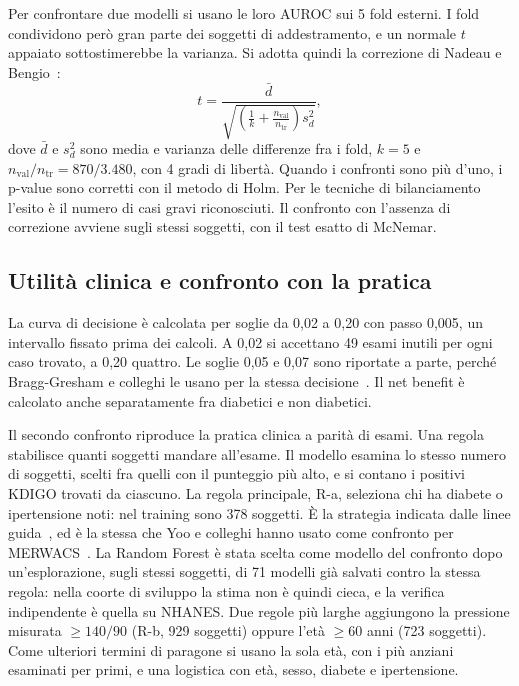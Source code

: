 \documentclass[a4paper, 12pt, oneside]{book}
\begin{document}
Per confrontare due modelli si usano le loro AUROC sui 5 fold esterni. I fold condividono però gran parte dei soggetti di addestramento, e un normale $t$ appaiato sottostimerebbe la varianza. Si adotta quindi la correzione di Nadeau e Bengio~\cite{nadeau_inference_2003}:
\begin{equation}
	t = \frac{\bar d}{\sqrt{\left(\frac{1}{k} + \frac{n_{\text{val}}}{n_{\text{tr}}}\right) s_d^2}},
\end{equation}
dove $\bar d$ e $s_d^2$ sono media e varianza delle differenze fra i fold, $k = 5$ e $n_{\text{val}}/n_{\text{tr}} = 870/3.480$, con 4 gradi di libertà. Quando i confronti sono più d'uno, i p-value sono corretti con il metodo di Holm. Per le tecniche di bilanciamento l'esito è il numero di casi gravi riconosciuti. Il confronto con l'assenza di correzione avviene sugli stessi soggetti, con il test esatto di McNemar.

\subsection{Utilità clinica e confronto con la pratica}

La curva di decisione è calcolata per soglie da 0,02 a 0,20 con passo 0,005, un intervallo fissato prima dei calcoli. A 0,02 si accettano 49 esami inutili per ogni caso trovato, a 0,20 quattro. Le soglie 0,05 e 0,07 sono riportate a parte, perché Bragg-Gresham e colleghi le usano per la stessa decisione~\cite{bragg-gresham_using_2025}. Il net benefit è calcolato anche separatamente fra diabetici e non diabetici.

Il secondo confronto riproduce la pratica clinica a parità di esami. Una regola stabilisce quanti soggetti mandare all'esame. Il modello esamina lo stesso numero di soggetti, scelti fra quelli con il punteggio più alto, e si contano i positivi KDIGO trovati da ciascuno. La regola principale, R-a, seleziona chi ha diabete o ipertensione noti: nel training sono 378 soggetti. È la strategia indicata dalle linee guida~\cite{stevens_kdigo_2024,american_diabetes_association_professional_practice_committee_11_2024}, ed è la stessa che Yoo e colleghi hanno usato come confronto per MERWACS~\cite{yoo_merwacs_2026}. La Random Forest è stata scelta come modello del confronto dopo un'esplorazione, sugli stessi soggetti, di 71 modelli già salvati contro la stessa regola: nella coorte di sviluppo la stima non è quindi cieca, e la verifica indipendente è quella su NHANES. Due regole più larghe aggiungono la pressione misurata $\geq 140/90$ (R-b, 929 soggetti) oppure l'età $\geq 60$ anni (723 soggetti). Come ulteriori termini di paragone si usano la sola età, con i più anziani esaminati per primi, e una logistica con età, sesso, diabete e ipertensione.
\end{document}
